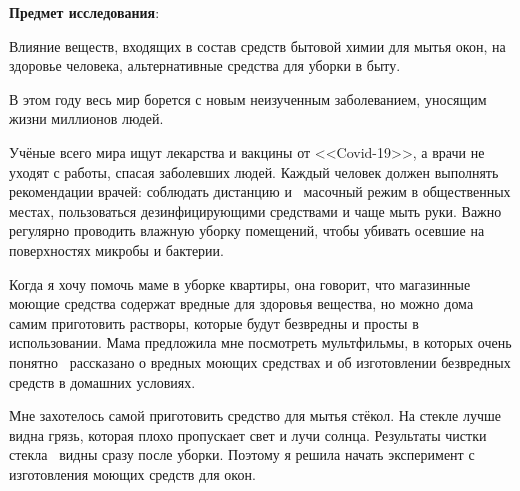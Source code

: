 \textbf{Предмет исследования}:

Влияние веществ, входящих в состав средств бытовой химии для мытья окон, на здоровье человека, альтернативные средства для уборки в быту.

В этом году весь мир борется с новым неизученным заболеванием, уносящим жизни миллионов людей.

Учёные всего мира ищут лекарства и вакцины от <<Covid-19>>, а врачи не уходят с работы, спасая заболевших людей. Каждый человек должен выполнять рекомендации врачей: соблюдать дистанцию и  масочный режим в общественных местах, пользоваться дезинфицирующими средствами и чаще мыть руки. Важно регулярно проводить влажную уборку помещений, чтобы убивать осевшие на поверхностях микробы и бактерии.

Когда я хочу помочь маме в уборке квартиры, она говорит, что магазинные моющие средства содержат вредные для здоровья вещества, но можно дома самим приготовить растворы, которые будут безвредны и просты в использовании. Мама предложила мне посмотреть мультфильмы, в которых очень понятно  рассказано о вредных моющих средствах и об изготовлении безвредных средств в домашних условиях.

Мне захотелось самой приготовить средство для мытья стёкол. На стекле лучше видна грязь, которая плохо пропускает свет и лучи солнца. Результаты чистки стекла  видны сразу после уборки. Поэтому я решила начать эксперимент с изготовления моющих средств для окон.
